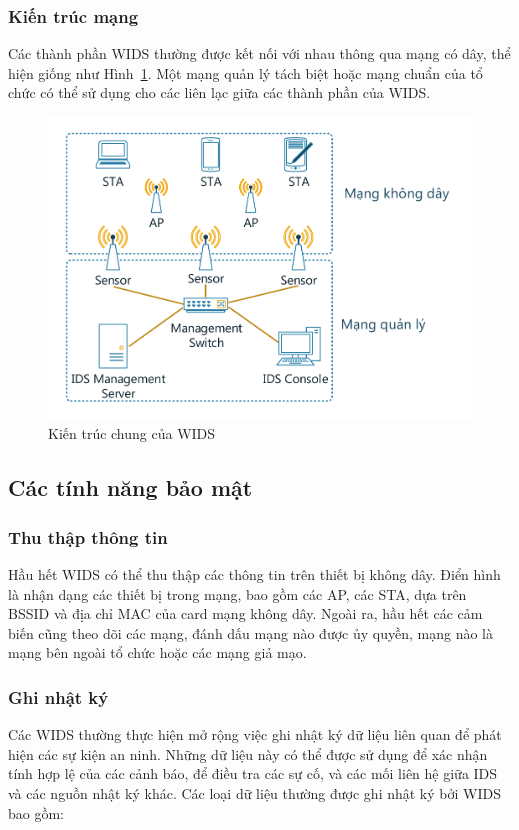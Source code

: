 \subsubsection{Kiến trúc mạng}
Các thành phần WIDS thường được kết nối với nhau thông qua mạng có dây, thể hiện giống như Hình~\ref{fig:wids-architecture}. Một mạng quản lý tách biệt hoặc mạng chuẩn của tổ chức có thể sử dụng cho các liên lạc giữa các thành phần của WIDS.

\begin{figure}[!h]
    \centering
    \includegraphics[width=1.0\textwidth]{wids-architecture}
    \caption{
        \label{fig:wids-architecture}
        Kiến trúc chung của WIDS}
\end{figure}

\subsection{Các tính năng bảo mật}

\subsubsection{Thu thập thông tin}
Hầu hết WIDS có thể thu thập các thông tin trên thiết bị không dây. Điển hình là nhận dạng các thiết bị trong mạng, bao gồm các AP, các STA, dựa trên BSSID và địa chỉ MAC của card mạng không dây. Ngoài ra, hầu hết các cảm biến cũng theo dõi các mạng, đánh dấu mạng nào được ủy quyền, mạng nào là mạng bên ngoài tổ chức hoặc các mạng giả mạo.

\subsubsection{Ghi nhật ký}
Các WIDS thường thực hiện mở rộng việc ghi nhật ký dữ liệu liên quan để phát hiện các sự kiện an ninh. Những dữ liệu này có thể được sử dụng để xác nhận tính hợp lệ của các cảnh báo, để điều tra các sự cố, và các mối liên hệ giữa IDS và các nguồn nhật ký khác. Các loại dữ liệu thường được ghi nhật ký bởi WIDS bao gồm:

